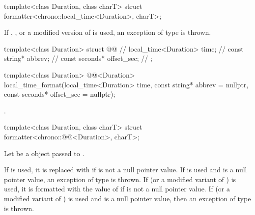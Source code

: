 %
\begin{itemdecl}
template<class Duration, class charT>
  struct formatter<chrono::local_time<Duration>, charT>;
\end{itemdecl}

\begin{itemdescr}
\pnum
\remarks
If , , or a modified version of  is used,
an exception of type  is thrown.
\end{itemdescr}

%
\begin{codeblock}
template<class Duration> struct @@ {           // \expos
  local_time<Duration> time;                                    // \expos
  const string* abbrev;                                         // \expos
  const seconds* offset_sec;                                    // \expos
};
\end{codeblock}

%
\begin{itemdecl}
template<class Duration>
  @@<Duration>
    local_time_format(local_time<Duration> time, const string* abbrev = nullptr,
                      const seconds* offset_sec = nullptr);
\end{itemdecl}

\begin{itemdescr}
\pnum
\returns
{}.
\end{itemdescr}

%
\begin{itemdecl}
template<class Duration, class charT>
  struct formatter<chrono::@@<Duration>, charT>;
\end{itemdecl}

\begin{itemdescr}
\pnum
Let  be a  object
passed to .

\pnum
\remarks
If  is used,
it is replaced with 
if  is not a null pointer value.
If  is used
and  is a null pointer value,
an exception of type  is thrown.
If  (or a modified variant of ) is used,
it is formatted with the value of 
if  is not a null pointer value.
If  (or a modified variant of ) is used
and  is a null pointer value,
then an exception of type  is thrown.
\end{itemdescr}

